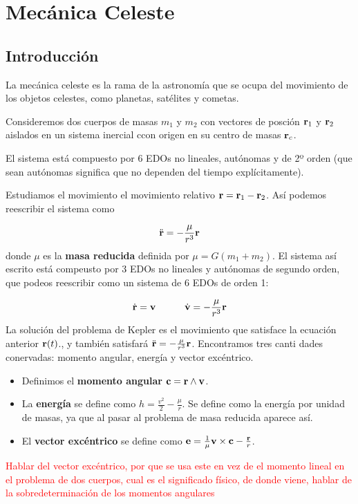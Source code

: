 \chapter{Mecánica Celeste}

\section{Introducción}
La mecánica celeste es la rama de la astronomía que se ocupa del movimiento de los objetos celestes, como planetas, satélites y cometas. 

Consideremos dos cuerpos de masas $m_1$ y $m_2$ con vectores de posción $\mathbf{r}_1$ y $\mathbf{r}_2$ aislados en un sistema inercial ccon origen en su centro de masas $\mathbf{r}_c$. 

El sistema está compuesto por 6 EDOs no lineales, autónomas y de 2º orden (que sean autónomas significa que no dependen del tiempo explícitamente). 

Estudiamos el movimiento el movimiento relativo $\mathbf{r}=\mathbf{r}_1-\mathbf{r}_2$. Así podemos reescribir el sistema como

\begin{equation}
    \ddot{\mathbf{r}} = - \frac{\mu}{r^3}\mathbf{r}
\end{equation}
donde $\mu$ es la \textbf{masa reducida} definida por $\mu=G(m_1+m_2)$. El sistema así escrito está compeusto por 3 EDOs no lineales y autónomas de segundo orden, que podeos reescribir como un sistema de 6 EDOs de orden 1:

\begin{equation}
    \dot{\mathbf{r}} = \mathbf{v} \quad \quad \quad \dot{\mathbf{v}}= - \frac{\mu}{r^3}\mathbf{r}
\end{equation}
La solución del problema de Kepler es el movimiento que satisface la ecuación anterior $\mathbf{r}(t)$., y también satisfará $\ddot{\mathbf{r}}=-\frac{\mu}{r^3} \mathbf{r}$. Encontramos tres canti dades conervadas: momento angular, energía y vector excéntrico. 

\begin{itemize}
    \item Definimos el \textbf{momento angular} $\mathbf{c} = \mathbf{r} \wedge \mathbf{v}$.
    \item La \textbf{energía} se define como $h=\frac{v^2}{2}-\frac{\mu}{r}$. Se define como la energía por unidad de masas, ya que al pasar al problema de masa reducida aparece así.
    \item El \textbf{vector excéntrico} se define como $\mathbf{e} = \frac{1}{\mu} \mathbf{v} \times \mathbf{c} - \frac{\mathbf{r}}{r}$. 
\end{itemize}
\begin{Anotacion}
    \textcolor{red}{ Hablar del vector excéntrico, por que se usa este en vez de el momento lineal en el problema de dos cuerpos, cual es el significado físico, de donde viene, hablar de la sobredeterminación de los momentos angulares }
\end{Anotacion}

